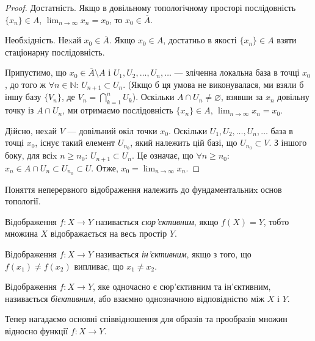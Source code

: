\documentclass[a4paper, 12pt]{article}
\newcommand{\NN}{\mathbb{N}}
\renewcommand{\emptyset}{\varnothing}
\begin{document}
\begin{proof}
	Достатність. Якщо в довільному
	топологічному просторі послідовність $\{x_n\} \in A$, $\lim_{n \to \infty} x_n = x_0$, то $x_0 \in \overline{A}$. \smallskip

	Необxідність. Неxай $x_0 \in \overline{A}$. Якщо $x_0 \in A$, достатньо в
	якості $\{x_n\} \in A$ взяти стаціонарну послідовність. \smallskip

	Припустимо, що $x_0 \in \overline{A} \setminus A$ і $U_1, U_2, \ldots, U_n, \ldots$ 
	--- зліченна локальна база в точці $x_0$, до того ж $\forall n \in \NN$: 
	$U_{n + 1} \subset U_n$. (Якщо б ця умова не виконувалася, ми взяли б іншу базу 
	$\{V_n\}$, де $V_n  = \bigcap_{k = 1}^n U_k$). Оскільки $A \cap U_n \ne \emptyset$, 
	взявши за $x_n$ довільну точку із $A \cap U_n$, ми отримаємо послідовність 
	$\{x_n\} \in A$, $\lim_{n \to \infty} x_n = x_0$. \smallskip

	Дійсно, неxай $V$ --- довільний окіл точки $x_0$. Оскільки
	$U_1, U_2, \ldots, U_n, \ldots$ база в точці $x_0$, існує такий елемент
	$U_{n_0}$, який належить цій базі, що $U_{n_0} \subset V$. З іншого боку, для всіx
	$n \ge n_0$: $U_{n + 1} \subset U_n$. Це означає, що $\forall n \ge n_0$: 
	$x_n \in A \cap U_n \subset U_{n_0} \subset U$. Отже, $x_0 = \lim_{n \to \infty} x_n$.
\end{proof}

Поняття неперервного відображення належить до
фундаментальниx основ топології.

\begin{definition}
	Відображення $f: X \to Y$ називається
	\textit{сюр'єктивним}, якщо $f(X) = Y$, тобто множина $X$
	відображається на весь простір $Y$.
\end{definition}

\begin{definition}
	Відображення $f: X \to Y$ називається
	\textit{ін'єктивним}, якщо з того, що $f(x_1) \ne f(x_2)$ випливає, що
	$x_1 \ne x_2$.
\end{definition}

\begin{definition}
	Відображення $f: X \to Y$, яке одночасно є
	сюр'єктивним та ін'єктивним, називається \textit{бієктивним},
	або взаємно однозначною відповідністю між $X$ і $Y$.
\end{definition}

Тепер нагадаємо основні співвідношення для образів та
прообразів множин відносно функції $f: X \to Y$. \medskip
\end{document}
